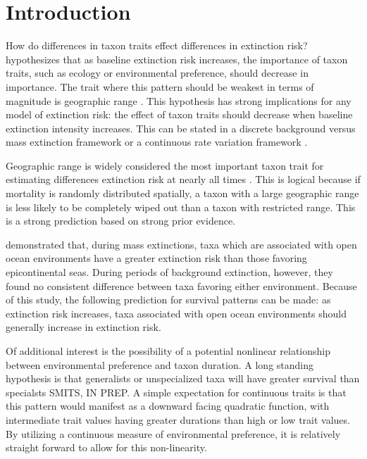 \documentclass[12pt,letterpaper]{article}
\begin{document}
\section{Introduction}

How do differences in taxon traits effect differences in extinction risk? \citet{Jablonski1987} hypothesizes that as baseline extinction risk increases, the importance of taxon traits, such as ecology or environmental preference, should decrease in importance. The trait where this pattern should be weakest in terms of magnitude is geographic range \citep{Jablonski1987}. This hypothesis has strong implications for any model of extinction risk: the effect of taxon traits should decrease when baseline extinction intensity increases. This can be stated in a discrete background versus mass extinction framework \citep{Jablonski1987} or a continuous rate variation framework \citep{Wang2003}.%

Geographic range is widely considered the most important taxon trait for estimating differences extinction risk at nearly all times \citep{Jablonski1986,Jablonski1987,Jablonski2003,Payne2007}. This is logical because if mortality is randomly distributed spatially, a taxon with a large geographic range is less likely to be completely wiped out than a taxon with restricted range. This is a strong prediction based on strong prior evidence.

\citet{Miller2009a} demonstrated that, during mass extinctions, taxa which are associated with open ocean environments have a greater extinction risk than those favoring epicontinental seas. During periods of background extinction, however, they found no consistent difference between taxa favoring either environment. Because of this study, the following prediction for survival patterns can be made: as extinction risk increases, taxa associated with open ocean environments should generally increase in extinction risk.

Of additional interest is the possibility of a potential nonlinear relationship between environmental preference and taxon duration. A long standing hypothesis is that generalists or unspecialized taxa will have greater survival than specialsts \citep{Simpson1944,Liow2004a,Nurnberg2013a,Nurnberg2015} \uppercase{Smits, in prep}. A simple expectation for continuous traits is that this pattern would manifest as a downward facing quadratic function, with intermediate trait values having greater durations than high or low trait values. By utilizing a continuous measure of environmental preference, it is relatively straight forward to allow for this non-linearity.
\end{document}
